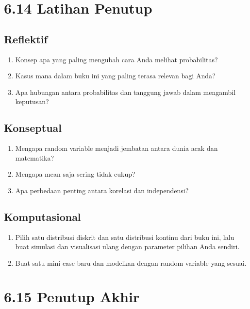 \documentclass[
  letterpaper,
  DIV=11,
  numbers=noendperiod]{scrreprt}
\providecommand{\tightlist}{%
  \setlength{\itemsep}{0pt}\setlength{\parskip}{0pt}}
\begin{document}
\section{6.14 Latihan Penutup}\label{latihan-penutup}

\subsection{Reflektif}\label{reflektif}

\begin{enumerate}
\def\labelenumi{\arabic{enumi}.}
\tightlist
\item
  Konsep apa yang paling mengubah cara Anda melihat probabilitas?
\item
  Kasus mana dalam buku ini yang paling terasa relevan bagi Anda?
\item
  Apa hubungan antara probabilitas dan tanggung jawab dalam mengambil
  keputusan?
\end{enumerate}

\subsection{Konseptual}\label{konseptual-1}

\begin{enumerate}
\def\labelenumi{\arabic{enumi}.}
\tightlist
\item
  Mengapa random variable menjadi jembatan antara dunia acak dan
  matematika?
\item
  Mengapa mean saja sering tidak cukup?
\item
  Apa perbedaan penting antara korelasi dan independensi?
\end{enumerate}

\subsection{Komputasional}\label{komputasional-1}

\begin{enumerate}
\def\labelenumi{\arabic{enumi}.}
\tightlist
\item
  Pilih satu distribusi diskrit dan satu distribusi kontinu dari buku
  ini, lalu buat simulasi dan visualisasi ulang dengan parameter pilihan
  Anda sendiri.
\item
  Buat satu mini-case baru dan modelkan dengan random variable yang
  sesuai.
\end{enumerate}

\section{6.15 Penutup Akhir}\label{penutup-akhir}
\end{document}
